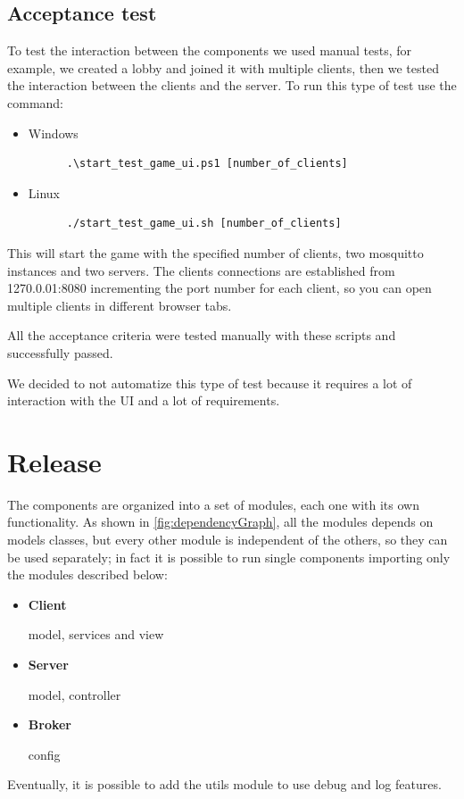 \documentclass{scrartcl}
\begin{document}
\subsection{Acceptance test}\label{acceptance-test}
To test the interaction between the components we used manual tests, for example, we created a 
lobby and joined it with multiple clients, then we tested the interaction between the clients and 
the server.
To run this type of test use the command:
\begin{itemize}
      \item Windows
            \begin{verbatim}
      .\start_test_game_ui.ps1 [number_of_clients]
            \end{verbatim}
      \item Linux
            \begin{verbatim}
      ./start_test_game_ui.sh [number_of_clients]
            \end{verbatim}
\end{itemize}
This will start the game with the specified number of clients, two mosquitto instances and two servers.
The clients connections are established from 1270.0.01:8080 incrementing the port number for each 
client, so you can  open multiple clients in different browser tabs.

All the acceptance criteria were tested manually with these scripts and successfully passed.

We decided to not automatize this type of test because it requires a lot of interaction with the UI 
and a lot of requirements.

\newpage
\section{Release}\label{release}
The components are organized into a set of modules, each one with its own functionality.
As shown in \cref{fig:dependencyGraph}, all the modules depends on models classes, but every other 
module is independent of the others, so they can be used separately; in fact it is possible to run 
single components importing only the modules described below:
\begin{itemize}
      \item \textbf{Client}\par
            model, services and view
      \item \textbf{Server}\par
            model, controller
      \item \textbf{Broker}\par
            config
\end{itemize}
Eventually, it is possible to add the utils module to use debug and log features.
\end{document}
